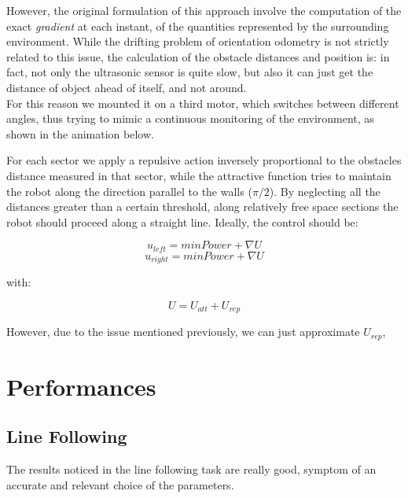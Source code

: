 \documentclass[a4paper,11pt,oneside]{book}
\begin{document}
			However, the original formulation of this approach involve the computation of the exact \emph{gradient} at each instant, of the quantities represented by the surrounding environment. While the drifting problem of orientation odometry is not strictly related to this issue, the calculation of the obstacle distances and position is: in fact, not only the ultrasonic sensor is quite slow, but also it can just get the distance of object ahead of itself, and not around.\\
			For this reason we mounted it on a third motor, which switches between different angles, thus trying to mimic a continuous monitoring of the environment, as shown in the animation below.
			
		
			\begin{center}	
			\end{center}
		
			
			For each sector we apply a repulsive action inversely proportional to the obstacles distance measured in that sector, while the attractive function tries to maintain the robot along the direction parallel to the walls ($\pi/2$). By neglecting all the distances greater than a certain threshold, along relatively free space sections the robot should proceed along a straight line. Ideally, the control should be:
			
				$$u_{left} = minPower + \nabla U$$
			    $$u_{right}= minPower + \nabla U$$
			    
			with:
			
				$$U = U_{att} + U_{rep} $$
				
			However, due to the issue mentioned previously, we can just approximate $U_{rep}$,
				
				
				
				
				
				
			
			\section{Performances}
			\subsection{Line Following}
			The results noticed in the line following task are really good, symptom of an accurate and relevant choice of the parameters.
			
			
			
\end{document}
